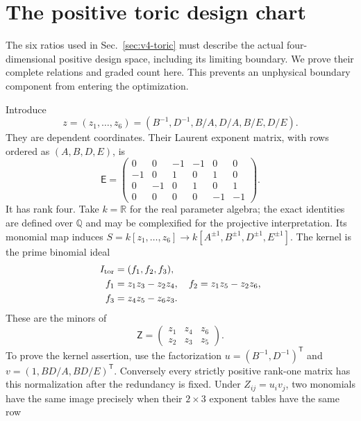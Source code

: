 \documentclass[aps,pre,reprint,amsmath,amssymb,longbibliography]{revtex4-2}
\begin{document}
\section{The positive toric design chart}\label{app:v4-toric}
\label{v4:alg:segre}
The six ratios used in Sec.~\ref{sec:v4-toric} must describe the actual
four-dimensional positive design space, including its limiting boundary.
We prove their complete relations and graded count here. This prevents an
unphysical boundary component from entering the optimization.

Introduce
\begin{equation}
 z=(z_1,\ldots,z_6)=
   (B^{-1},D^{-1},B/A,D/A,B/E,D/E).
 \label{v4:alg:toric-coordinates}
\end{equation}
They are dependent coordinates. Their Laurent exponent matrix, with rows
ordered as $(A,B,D,E)$, is
\begin{equation}
 \mathsf E=\begin{pmatrix}
 0&0&-1&-1&0&0\\
 -1&0&1&0&1&0\\
 0&-1&0&1&0&1\\
 0&0&0&0&-1&-1
 \end{pmatrix}.
 \label{v4:alg:exponent-matrix}
\end{equation}
It has rank four. Take $k=\mathbb R$ for the real parameter algebra;
the exact identities are defined over $\mathbb Q$ and may be
complexified for the projective interpretation. Its monomial map induces
$S=k[z_1,\ldots,z_6]\to k[A^{\pm1},B^{\pm1},D^{\pm1},E^{\pm1}]$.
The kernel is the prime binomial ideal
\begin{align}
 I_{\rm tor}&=(f_1,f_2,f_3),\\
 f_1&=z_1z_3-z_2z_4,\quad
 f_2=z_1z_5-z_2z_6,\notag\\
 f_3&=z_4z_5-z_6z_3.
 \label{v4:alg:toric-ideal}
\end{align}
These are the minors of
\begin{equation}
 \mathsf Z=\begin{pmatrix}z_1&z_4&z_6\\z_2&z_3&z_5\end{pmatrix}.
 \label{v4:alg:segre-matrix}
\end{equation}
To prove the kernel assertion, use the factorization
$u=(B^{-1},D^{-1})^{\mathsf T}$ and
$v=(1,BD/A,BD/E)^{\mathsf T}$. Conversely every strictly positive
rank-one matrix has this normalization after the redundancy is fixed.
Under $Z_{ij}=u_i v_j$, two monomials have the same
image precisely when their $2\times3$ exponent tables have the same row
\end{document}

